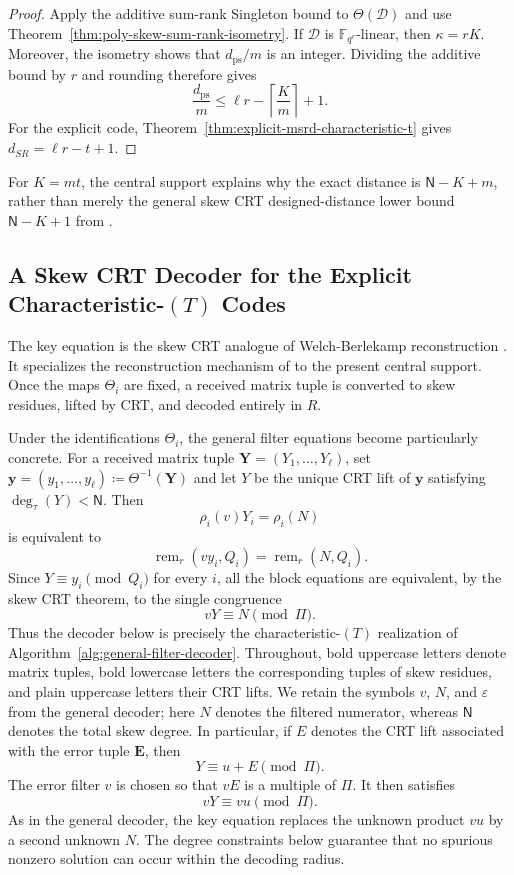 \documentclass[10pt,a4paper]{amsart}
\theoremstyle{definition}
\theoremstyle{plain}
\theoremstyle{remark}
\newcommand{\vF}{\mathbb F}
\renewcommand{\epsilon}{\varepsilon}
\begin{document}
\begin{proof}
Apply the additive sum-rank Singleton bound to $\Theta(\mathcal D)$ and use
Theorem~\ref{thm:poly-skew-sum-rank-isometry}. If $\mathcal D$ is
$\vF_{q^r}$-linear, then $\kappa=rK$. Moreover, the isometry shows that
$d_{\mathrm{ps}}/m$ is an integer. Dividing the additive bound by $r$ and
rounding therefore gives
$$
\frac{d_{\mathrm{ps}}}{m}
\leq
\ell r-\left\lceil\frac{K}{m}\right\rceil+1.
$$
For the explicit code,
Theorem~\ref{thm:explicit-msrd-characteristic-t} gives
$d_{SR}=\ell r-t+1$.
\end{proof}

For $K=mt$, the central support explains why the exact distance is
$\mathsf N-K+m$, rather than merely the general skew CRT designed-distance
lower bound $\mathsf N-K+1$ from \cite[Proposition~5]{NR26}.

\subsection{A Skew CRT Decoder for the Explicit
Characteristic-\texorpdfstring{$(T)$}{(T)} Codes}

The key equation is the skew CRT analogue of Welch-Berlekamp reconstruction
\cite{Gab85,Loi04,Loi06}. It specializes the reconstruction mechanism of
\cite[Propositions~6 and~7]{NR26} to the present central support. Once the
maps $\Theta_i$ are fixed, a received matrix tuple is converted to skew
residues, lifted by CRT, and decoded entirely in $R$.

Under the identifications $\Theta_i$, the general filter equations become
particularly concrete. For a received matrix tuple
$\boldsymbol Y=(Y_1,\ldots,Y_\ell)$, set
$\boldsymbol y=(y_1,\ldots,y_\ell)
\coloneqq\Theta^{-1}(\boldsymbol Y)$ and let $Y$ be the unique CRT lift of
$\boldsymbol y$ satisfying $\deg_\tau(Y)<\mathsf N$. Then
$$
\rho_i(v)Y_i=\rho_i(N)
$$
is equivalent to
$$
\operatorname{rem}_r(vy_i,Q_i)
=
\operatorname{rem}_r(N,Q_i).
$$
Since $Y\equiv y_i\pmod{Q_i}$ for every $i$, all the block equations are
equivalent, by the skew CRT theorem, to the single congruence
$$
vY\equiv N\pmod{\Pi}.
$$
Thus the decoder below is precisely the characteristic-$(T)$ realization of
Algorithm~\ref{alg:general-filter-decoder}. Throughout, bold uppercase
letters denote matrix tuples, bold lowercase letters the corresponding tuples
of skew residues, and plain uppercase letters their CRT lifts. We retain the
symbols $v$, $N$, and $\epsilon$ from the general decoder; here $N$ denotes
the filtered numerator, whereas $\mathsf N$ denotes the total skew degree. In
particular, if $E$ denotes the CRT lift associated with the error tuple
$\boldsymbol E$, then
$$
Y\equiv u+E\pmod{\Pi}.
$$
The error filter $v$ is chosen so that $vE$ is a multiple of $\Pi$. It then
satisfies
$$
vY\equiv vu\pmod{\Pi}.
$$
As in the general decoder, the key equation replaces the unknown product
$vu$ by a second unknown $N$. The degree constraints below guarantee that no
spurious nonzero solution can occur within the decoding radius.
\end{document}
